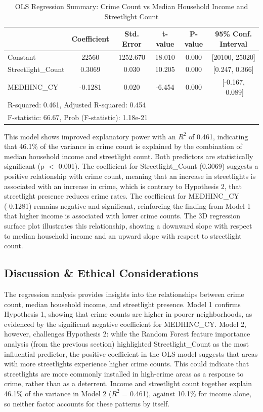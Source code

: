 \documentclass{report}
\begin{document}
\begin{table}[htbp]
  \centering
  \caption{OLS Regression Summary: Crime Count vs Median Household Income and Streetlight Count}
  \label{tab:model2_summary}
  \begin{tabular}{lccccc}
    \toprule
    & Coefficient & Std. Error & t-value & P-value & 95\% Conf. Interval \\
    \midrule
    Constant & 22560 & 1252.670 & 18.010 & 0.000 & [20100, 25020] \\
    Streetlight\_Count & 0.3069 & 0.030 & 10.205 & 0.000 & [0.247, 0.366] \\
    MEDHINC\_CY & -0.1281 & 0.020 & -6.454 & 0.000 & [-0.167, -0.089] \\
    \midrule
    \multicolumn{6}{l}{R-squared: 0.461, Adjusted R-squared: 0.454} \\
    \multicolumn{6}{l}{F-statistic: 66.67, Prob (F-statistic): 1.18e-21} \\
    \bottomrule
  \end{tabular}
\end{table}

\par This model shows improved explanatory power with an $R^2$ of 0.461, indicating that 46.1\% of the variance in crime count is explained by the combination of median household income and streetlight count. Both predictors are statistically significant (p $<$ 0.001). The coefficient for Streetlight\_Count (0.3069) suggests a positive relationship with crime count, meaning that an increase in streetlights is associated with an increase in crime, which is contrary to Hypothesis 2,
that streetlight presence reduces crime rates. The coefficient for MEDHINC\_CY (-0.1281) remains negative and significant, reinforcing the finding from Model 1 that higher income is associated with lower crime counts. The 3D regression surface plot illustrates this relationship, showing a downward slope with respect to median household income and an upward slope with respect to streetlight count.

\subsection{Discussion \& Ethical Considerations}
\par The regression analysis provides insights into the relationships between crime count, median household income, and streetlight presence. Model 1 confirms Hypothesis 1, showing that crime counts are higher in poorer neighborhoods, as evidenced by the significant negative coefficient for MEDHINC\_CY. Model 2, however, challenges Hypothesis 2: while the Random Forest feature importance analysis (from the previous section) highlighted Streetlight\_Count as the most influential predictor, the positive coefficient in the OLS model suggests that areas with more streetlights experience higher crime counts. This could indicate that streetlights are more commonly installed in high-crime areas as a response to crime, rather than as a deterrent. Income and streetlight count together explain 46.1\% of the variance in Model 2 ($R^2$ = 0.461), against 10.1\% for income alone, so neither factor accounts for these patterns by itself.
\end{document}
